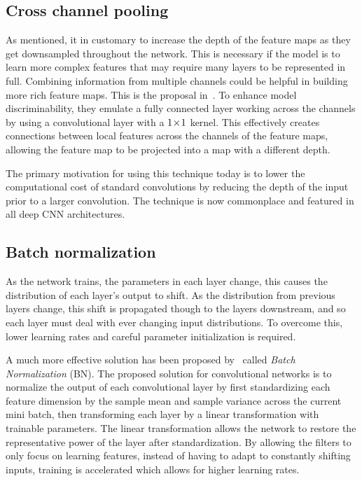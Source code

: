 \subsection{Cross channel pooling}

As mentioned, it in customary to increase the depth of the feature maps as they get downsampled throughout the network.
This is necessary if the model is to learn more complex features that may require many layers to be represented in full.
Combining information from multiple channels could be helpful in building more rich feature maps.
This is the proposal in\ \textcite{lin2014network}.
To enhance model discriminability, they emulate a fully connected layer working across the channels by using a convolutional layer with a \(1\!\times \! 1\) kernel.
This effectively creates connections between local features across the channels of the feature maps, allowing the feature map to be projected into a map with a different depth.

The primary motivation for using this technique today is to lower the computational cost of standard convolutions by reducing the depth of the input prior to a larger convolution.
The technique is now commonplace and featured in all deep CNN architectures.

\subsection{Batch normalization}
As the network trains, the parameters in each layer change, this causes the distribution of each layer’s output to shift.
As the distribution from previous layers change, this shift is propagated though to the layers downstream, and so each layer must deal with ever changing input distributions.
To overcome this, lower learning rates and careful parameter initialization is required.

A much more effective solution has been proposed by\ \textcite{ioffe2015batch} called \textit{Batch Normalization} (BN).
The proposed solution for convolutional networks is to normalize the output of each convolutional layer by first standardizing each feature dimension by the sample mean and sample variance across the current mini batch, then transforming each layer by a linear transformation with trainable parameters.
The linear transformation allows the network to restore the representative power of the layer after standardization.
By allowing the filters to only focus on learning features, instead of having to adapt to constantly shifting inputs, training is accelerated which allows for higher learning rates.

